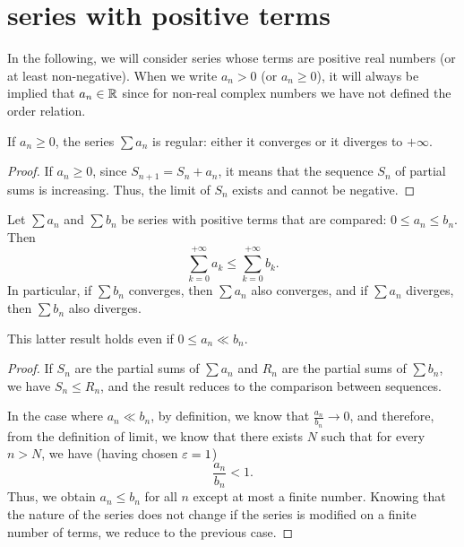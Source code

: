 \section{series with positive terms}

In the following, we will consider series whose terms are positive real numbers
(or at least non-negative).
When we write $a_n >0$ (or $a_n \ge 0$), it will always be implied that $a_n\in
{\mathbb R}$ since for non-real complex numbers we have not defined the order relation.

\begin{theorem}\label{th:serie_positiva}
\mymark{***}%
%
%
If $a_n\ge 0$, the series $\sum a_n$ is regular:
either it converges or it diverges to $+\infty$.
\end{theorem}
%
\begin{proof}
\mymark{***}
If $a_n \ge 0$, since $S_{n+1} = S_n + a_n$, it means that the sequence $S_n$ of
partial sums is increasing.
Thus, the limit of $S_n$ exists and cannot be negative.
\end{proof}

\begin{theorem}
\mymark{**}
Let $\sum a_n$ and $\sum b_n$ be series with positive terms that are compared:
$0\le a_n\le b_n$.
Then
\[
  \sum_{k=0}^{+\infty} a_k \le \sum_{k=0}^{+\infty} b_k.
\]
In particular, if $\sum b_n$ converges, then $\sum a_n$ also converges, and if
$\sum a_n$ diverges, then $\sum b_n$ also diverges.

This latter result holds even if $0 \le a_n \ll b_n$.
\end{theorem}
%
\begin{proof}
\mymark{*}
If $S_n$ are the partial sums of $\sum a_n$ and $R_n$ are the partial sums of
$\sum b_n$, we have $S_n \le R_n$, and the result reduces to the comparison
between sequences.

In the case where $a_n \ll b_n$, by definition, we know that $\frac{a_n}{b_n}\to
0$, and therefore, from the definition of limit, we know that there exists $N$
such that for every $n>N$, we have (having chosen $\varepsilon=1$)
\[
  \frac{a_n}{b_n} < 1.
\]
Thus, we obtain $a_n \le b_n$ for all $n$ except at most a finite number.
Knowing that the nature of the series does not change if the series is modified
on a finite number of terms, we reduce to the previous case.
\end{proof}

